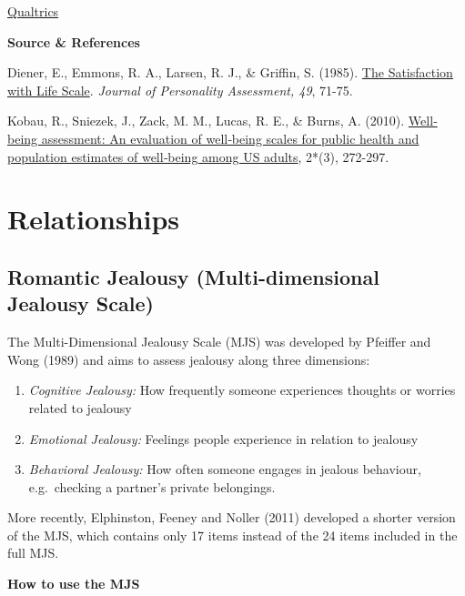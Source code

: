 \documentclass[
]{book}
\providecommand{\tightlist}{%
  \setlength{\itemsep}{0pt}\setlength{\parskip}{0pt}}
\begin{document}
\href{/questionnaires/Satisfaction_of_Life_Scale}{Qualtrics}

\textbf{Source \& References}

Diener, E., Emmons, R. A., Larsen, R. J., \& Griffin, S. (1985). \href{https://emmons.faculty.ucdavis.edu/wp-content/uploads/sites/90/2015/08/1985_5-SWLS.pdf}{The Satisfaction with Life Scale}. \emph{Journal of Personality Assessment, 49}, 71-75.

Kobau, R., Sniezek, J., Zack, M. M., Lucas, R. E., \& Burns, A. (2010). \href{https://iaap-journals.onlinelibrary.wiley.com/doi/abs/10.1111/j.1758-0854.2010.01035.x.*Applied\%20Psychology:\%20Health\%20and\%20Well-being}{Well‐being assessment: An evaluation of well‐being scales for public health and population estimates of well‐being among US adults}, 2*(3), 272-297.

\hypertarget{relationships}{%
\section{Relationships}\label{relationships}}

\hypertarget{romantic-jealousy-multi-dimensional-jealousy-scale}{%
\subsection{Romantic Jealousy (Multi-dimensional Jealousy Scale)}\label{romantic-jealousy-multi-dimensional-jealousy-scale}}

The Multi-Dimensional Jealousy Scale (MJS) was developed by Pfeiffer and Wong (1989) and aims to assess jealousy along three dimensions:

\begin{enumerate}
\def\labelenumi{\arabic{enumi}.}
\tightlist
\item
  \emph{Cognitive Jealousy:} How frequently someone experiences thoughts or worries related to jealousy
\item
  \emph{Emotional Jealousy:} Feelings people experience in relation to jealousy
\item
  \emph{Behavioral Jealousy:} How often someone engages in jealous behaviour, e.g.~checking a partner's private belongings.
\end{enumerate}

More recently, Elphinston, Feeney and Noller (2011) developed a shorter version of the MJS, which contains only 17 items instead of the 24 items included in the full MJS.

\textbf{How to use the MJS}
\end{document}
